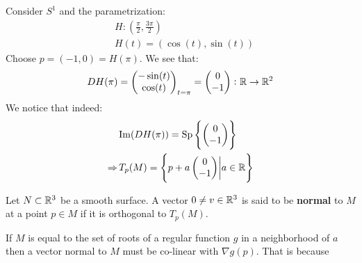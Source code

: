 \documentclass[11pt,a4paper]{article}
\begin{document}
	\begin{example}
		Consider $S^1$ and the parametrization:
		\begin{align*}
			&H \colon \left(\frac{\pi}{2}, \frac{3\pi}{2}\right) \\
			&H(t) = (\cos(t), \sin(t))
		\end{align*}
		Choose $p = (-1,0) = H(\pi)$. We see that:
		\[
			DH(\pi) = 
			\begin{pmatrix}
				-\sin(t)\\
				\cos(t)\\
			\end{pmatrix}_{t=\pi} = 
			\begin{pmatrix}
				0\\
				-1\\
			\end{pmatrix} \colon \mathbb{R} \to \mathbb{R}^2
		\]
		We notice that indeed:
		\begin{align*}
			&\mathrm{Im}(DH(\pi)) = \mathrm{Sp}
			\left\{\begin{pmatrix}
				0\\
				-1\\
			\end{pmatrix}\right\} \\
			\Rightarrow \,&T_p(M) =
			\left\{p + a\begin{pmatrix}
				0\\
				-1\\
			\end{pmatrix} \biggr\vert a \in \mathbb{R} \right\}
		\end{align*}
	\end{example}
	\begin{definition}
		Let $N \subset \mathbb{R}^3$ be a smooth surface. A vector 
		$0 \neq v \in \mathbb{R}^3$ is said to be \textbf{normal} to $M$ at a 
		point $p \in M$ if it is orthogonal to $T_p(M)$.
	\end{definition}
	\begin{remark}
		If $M$ is equal to the set of roots of a regular function $g$
		in a neighborhood of $a$ then a vector normal to $M$ must be 
		co-linear with $\nabla g(p)$. 
    That is because
	\end{remark}
	
	\newpage
	
\end{document}
